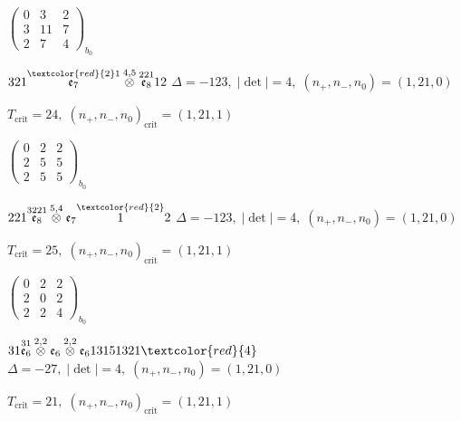 \documentclass[10pt]{article}
\begin{document}
\hspace{2em}$\left(\begin{smallmatrix}0 & 3 & 2 \\ 3 & 11 & 7 \\ 2 & 7 & 4\end{smallmatrix}\right)_{\!b_0}$

\smallskip

$321\overset{\textcolor{red}{2}1}{\mathfrak{e}_7}\overset{4,5}{\otimes}\overset{221}{\mathfrak{e}_8}12$ \quad $\Delta=-123,\; |\det|=4,\; (n_+,n_-,n_0)=(1,21,0)$

\hspace{1em}$T_{\text{crit}}=24,\; (n_+,n_-,n_0)_{\text{crit}}=(1,21,1)$

\hspace{2em}$\left(\begin{smallmatrix}0 & 2 & 2 \\ 2 & 5 & 5 \\ 2 & 5 & 5\end{smallmatrix}\right)_{\!b_0}$

\smallskip

$221\overset{3221}{\mathfrak{e}_8}\overset{5,4}{\otimes}\mathfrak{e}_7\overset{\textcolor{red}{2}}{1}2$ \quad $\Delta=-123,\; |\det|=4,\; (n_+,n_-,n_0)=(1,21,0)$

\hspace{1em}$T_{\text{crit}}=25,\; (n_+,n_-,n_0)_{\text{crit}}=(1,21,1)$

\hspace{2em}$\left(\begin{smallmatrix}0 & 2 & 2 \\ 2 & 0 & 2 \\ 2 & 2 & 4\end{smallmatrix}\right)_{\!b_0}$

\smallskip

$31\overset{31}{\mathfrak{e}_6}\overset{2,2}{\otimes}\mathfrak{e}_6\overset{2,2}{\otimes}\mathfrak{e}_613151321\textcolor{red}{4}$ \quad $\Delta=-27,\; |\det|=4,\; (n_+,n_-,n_0)=(1,21,0)$

\hspace{1em}$T_{\text{crit}}=21,\; (n_+,n_-,n_0)_{\text{crit}}=(1,21,1)$
\end{document}
